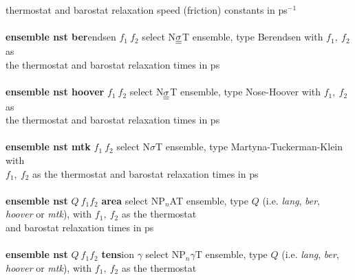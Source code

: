 \begin{tabbing}
\>                                              \> thermostat and barostat relaxation speed (friction) constants in ps$^{-1}$ \\
\>                                              \> \\
\> {\bf ensemble nst ber}endsen $f_{1}~f_{2}$   \> select N$\mbox{$\underline{\underline{\bf \sigma}}$}$T ensemble, type Berendsen with $f_{1},~f_{2}$ as \\
\>                                              \> the thermostat and barostat relaxation times in ps \\
\>                                              \> \\
\> {\bf ensemble nst hoover} $f_{1}~f_{2}$      \> select N$\mbox{$\underline{\underline{\bf \sigma}}$}$T ensemble, type Nose-Hoover with $f_{1},~f_{2}$ as \\
\>                                              \> the thermostat and barostat relaxation times in ps \\
\>                                              \> \\
\> {\bf ensemble nst mtk} $f_{1}~f_{2}$         \> select N$\sigma$T ensemble, type Martyna-Tuckerman-Klein with \\
\>                                              \> $f_{1},~f_{2}$ as the thermostat and barostat relaxation times in ps \\
\>                                              \> \\
\> {\bf ensemble nst} $Q~f_{1} f_{2}$ {\bf area} \> select NP$_{n}$AT ensemble, type $Q$ (i.e. {\em lang}, {\em ber}, \\
\>                                              \> {\em hoover} or {\em mtk}), with $f_{1},~f_{2}$ as the thermostat \\
\>                                              \> and barostat relaxation times in ps \\
\>                                              \> \\
\> {\bf ensemble nst} $Q~f_{1} f_{2}$ {\bf tens}ion $\gamma$ \> select NP$_{n}\gamma$T ensemble, type $Q$ (i.e. {\em lang}, {\em ber}, \\
\>                                              \> {\em hoover} or {\em mtk}), with $f_{1},~f_{2}$ as the thermostat \\

\end{tabbing}
